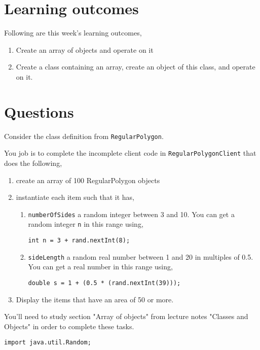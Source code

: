 
\section*{Learning outcomes}
Following are this week's learning outcomes,
\begin{enumerate}
\item Create an array of objects and operate on it
\item Create a class containing an array, create an object of this class, and operate on it.
\end{enumerate}

\section*{Questions}
\begin{questions}

\question 
Consider the class definition from \texttt{RegularPolygon}.

You job is to complete the incomplete client code in \texttt{RegularPolygonClient} that does the following,

\begin{enumerate}
  	\item create an array of 100 RegularPolygon objects
	\item instantiate each item such that it has,
	\begin{enumerate}
  		\item \texttt{numberOfSides} a random integer between 3 and 10. You can get a random integer \texttt{n} in this range using,  		\begin{lstlisting}
int n = 3 + rand.nextInt(8);
				\end{lstlisting}
		\item \texttt{sideLength} a random real number between 1 and 20 in multiples of 0.5. You can get a real number in this range using,
		\begin{lstlisting}
double s = 1 + (0.5 * (rand.nextInt(39)));
		\end{lstlisting}
	\end{enumerate}
	\item Display the items that have an area of 50 or more.
\end{enumerate}

You'll need to study section "Array of objects" from lecture notes "Classes and Objects" in order to complete these tasks.

\begin{solution}
\begin{lstlisting}
import java.util.Random;


\end{lstlisting}
\end{solution}
\end{questions}
